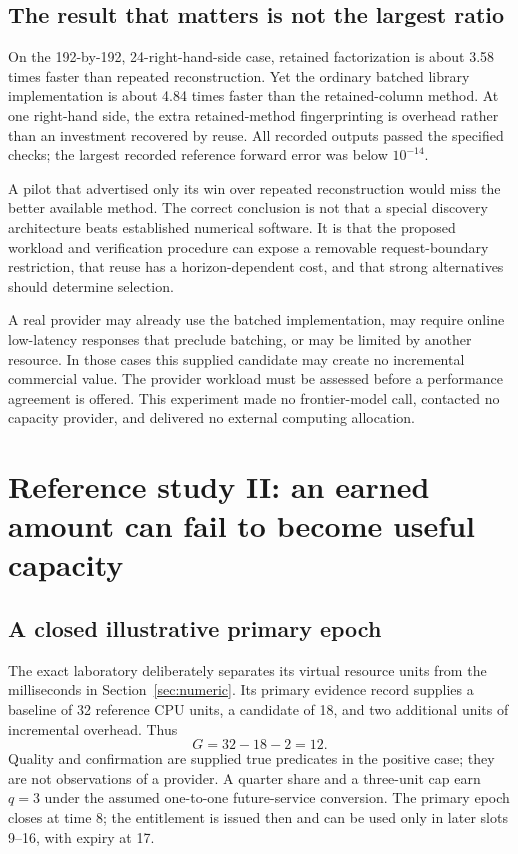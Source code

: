\documentclass[11pt,letterpaper]{article}
\theoremstyle{remark}\newtheorem{remark}{Remark}[section]
\begin{document}
\subsection{The result that matters is not the largest ratio}
On the 192-by-192, 24-right-hand-side case, retained factorization is about 3.58 times faster than repeated reconstruction. Yet the ordinary batched library implementation is about 4.84 times faster than the retained-column method. At one right-hand side, the extra retained-method fingerprinting is overhead rather than an investment recovered by reuse. All recorded outputs passed the specified checks; the largest recorded reference forward error was below $10^{-14}$.

A pilot that advertised only its win over repeated reconstruction would miss the better available method. The correct conclusion is not that a special discovery architecture beats established numerical software. It is that the proposed workload and verification procedure can expose a removable request-boundary restriction, that reuse has a horizon-dependent cost, and that strong alternatives should determine selection.

A real provider may already use the batched implementation, may require online low-latency responses that preclude batching, or may be limited by another resource. In those cases this supplied candidate may create no incremental commercial value. The provider workload must be assessed before a performance agreement is offered. This experiment made no frontier-model call, contacted no capacity provider, and delivered no external computing allocation.

\section{Reference study II: an earned amount can fail to become useful capacity}
\label{sec:exact}
\subsection{A closed illustrative primary epoch}
The exact laboratory deliberately separates its virtual resource units from the milliseconds in Section~\ref{sec:numeric}. Its primary evidence record supplies a baseline of 32 reference CPU units, a candidate of 18, and two additional units of incremental overhead. Thus
\begin{equation}
G=32-18-2=12.
\end{equation}
Quality and confirmation are supplied true predicates in the positive case; they are not observations of a provider. A quarter share and a three-unit cap earn $q=3$ under the assumed one-to-one future-service conversion. The primary epoch closes at time 8; the entitlement is issued then and can be used only in later slots 9--16, with expiry at 17.
\end{document}
